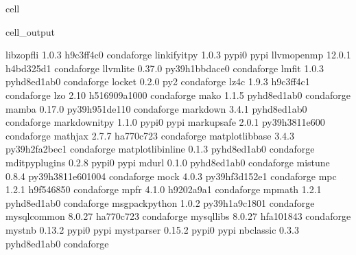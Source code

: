 \documentclass[letterpaper,table,10pt,english]{jupyterBook}
\begin{document}
\begin{sphinxuseclass}{cell}
\begin{sphinxVerbatimOutput}
\begin{sphinxuseclass}{cell_output}
\begin{sphinxVerbatim}[commandchars=\\\{\}]
libzopfli                 1.0.3                h9c3ff4c\PYGZus{}0    conda\PYGZhy{}forge
linkify\PYGZhy{}it\PYGZhy{}py             1.0.3                    pypi\PYGZus{}0    pypi
llvm\PYGZhy{}openmp               12.0.1               h4bd325d\PYGZus{}1    conda\PYGZhy{}forge
llvmlite                  0.37.0           py39h1bbdace\PYGZus{}0    conda\PYGZhy{}forge
lmfit                     1.0.3              pyhd8ed1ab\PYGZus{}0    conda\PYGZhy{}forge
locket                    0.2.0                      py\PYGZus{}2    conda\PYGZhy{}forge
lz4\PYGZhy{}c                     1.9.3                h9c3ff4c\PYGZus{}1    conda\PYGZhy{}forge
lzo                       2.10              h516909a\PYGZus{}1000    conda\PYGZhy{}forge
mako                      1.1.5              pyhd8ed1ab\PYGZus{}0    conda\PYGZhy{}forge
mamba                     0.17.0           py39h951de11\PYGZus{}0    conda\PYGZhy{}forge
markdown                  3.4.1              pyhd8ed1ab\PYGZus{}0    conda\PYGZhy{}forge
markdown\PYGZhy{}it\PYGZhy{}py            1.1.0                    pypi\PYGZus{}0    pypi
markupsafe                2.0.1            py39h3811e60\PYGZus{}0    conda\PYGZhy{}forge
mathjax                   2.7.7                ha770c72\PYGZus{}3    conda\PYGZhy{}forge
matplotlib\PYGZhy{}base           3.4.3            py39h2fa2bec\PYGZus{}1    conda\PYGZhy{}forge
matplotlib\PYGZhy{}inline         0.1.3              pyhd8ed1ab\PYGZus{}0    conda\PYGZhy{}forge
mdit\PYGZhy{}py\PYGZhy{}plugins           0.2.8                    pypi\PYGZus{}0    pypi
mdurl                     0.1.0              pyhd8ed1ab\PYGZus{}0    conda\PYGZhy{}forge
mistune                   0.8.4           py39h3811e60\PYGZus{}1004    conda\PYGZhy{}forge
mock                      4.0.3            py39hf3d152e\PYGZus{}1    conda\PYGZhy{}forge
mpc                       1.2.1                h9f54685\PYGZus{}0    conda\PYGZhy{}forge
mpfr                      4.1.0                h9202a9a\PYGZus{}1    conda\PYGZhy{}forge
mpmath                    1.2.1              pyhd8ed1ab\PYGZus{}0    conda\PYGZhy{}forge
msgpack\PYGZhy{}python            1.0.2            py39h1a9c180\PYGZus{}1    conda\PYGZhy{}forge
mysql\PYGZhy{}common              8.0.27               ha770c72\PYGZus{}3    conda\PYGZhy{}forge
mysql\PYGZhy{}libs                8.0.27               hfa10184\PYGZus{}3    conda\PYGZhy{}forge
myst\PYGZhy{}nb                   0.13.2                   pypi\PYGZus{}0    pypi
myst\PYGZhy{}parser               0.15.2                   pypi\PYGZus{}0    pypi
nbclassic                 0.3.3              pyhd8ed1ab\PYGZus{}0    conda\PYGZhy{}forge

\end{sphinxVerbatim}
\end{sphinxuseclass}
\end{sphinxVerbatimOutput}
\end{sphinxuseclass}
\end{document}
